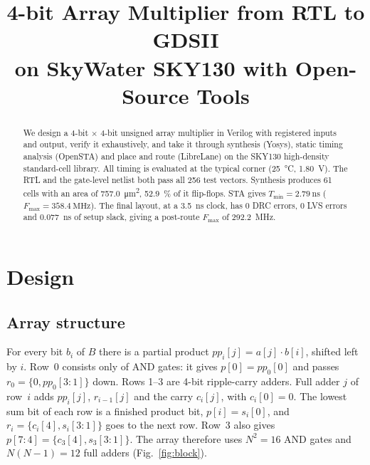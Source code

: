 \documentclass[conference,10pt]{IEEEtran}
\newcommand{\Tmin}{T_{\mathrm{min}}}
\newcommand{\Fmax}{F_{\mathrm{max}}}
\begin{document}
\title{4-bit Array Multiplier from RTL to GDSII\\on SkyWater SKY130 with Open-Source Tools}

\author{
}

\maketitle

\begin{abstract}
We design a 4-bit $\times$ 4-bit unsigned array multiplier in Verilog with registered inputs and
output, verify it exhaustively, and take it through synthesis (Yosys), static timing analysis
(OpenSTA) and place and route (LibreLane) on the SKY130 high-density standard-cell library. All
timing is evaluated at the typical corner (\SI{25}{\celsius}, \SI{1.80}{\volt}). The RTL and the
gate-level netlist both pass all 256 test vectors. Synthesis produces 61 cells with an area of
\SI{757.0}{\square\micro\metre}, \SI{52.9}{\percent} of it flip-flops. STA gives
$\Tmin = \SI{2.79}{\nano\second}$ ($\Fmax = \SI{358.4}{\mega\hertz}$). The final layout, at a
\SI{3.5}{\nano\second} clock, has 0 DRC errors, 0 LVS errors and \SI{0.077}{\nano\second} of setup
slack, giving a post-route $\Fmax$ of \SI{292.2}{\mega\hertz}.
\end{abstract}

\section{Design}

\subsection{Array structure}
For every bit $b_i$ of $B$ there is a partial product $pp_i[j] = a[j] \cdot b[i]$, shifted left by
$i$. Row~0 consists only of AND gates: it gives $p[0] = pp_0[0]$ and passes
$r_0 = \{0, pp_0[3{:}1]\}$ down. Rows 1--3 are 4-bit ripple-carry adders. Full adder $j$ of row~$i$
adds $pp_i[j]$, $r_{i-1}[j]$ and the carry $c_i[j]$, with $c_i[0] = 0$. The lowest sum bit of each
row is a finished product bit, $p[i] = s_i[0]$, and $r_i = \{c_i[4], s_i[3{:}1]\}$ goes to the next
row. Row~3 also gives $p[7{:}4] = \{c_3[4], s_3[3{:}1]\}$. The array therefore uses $N^2 = 16$ AND
gates and $N(N-1) = 12$ full adders (Fig.~\ref{fig:block}).
\end{document}
